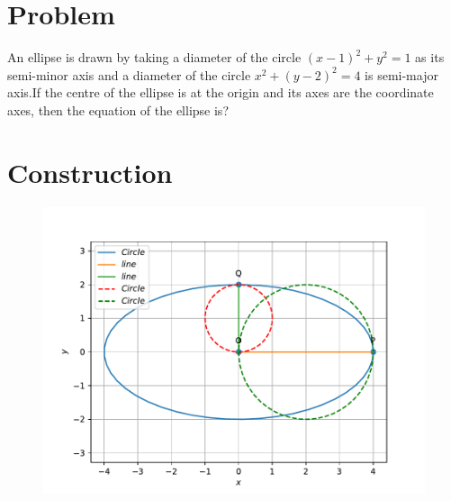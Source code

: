 \documentclass[10pt, a4paper]{article}
\title{\mytitle}
\author{\myauthor\hspace{1em}\\\contact\\FWC22012\hspace{6.5em}IITH\hspace{0.5em}\mymodule\hspace{6em}ASSIGN-6}
\date{}
\begin{document}
	\maketitle
\section{Problem}
An ellipse is drawn by taking a diameter of the circle
\begin{math}
(x-1)^2 + y^2=1
\end{math}
 as its semi-minor axis and a diameter of the circle 
 \begin{math}
x^2 + (y-2)^2=4
\end{math} is semi-major axis.If the centre of the ellipse is at the origin and its axes are the coordinate axes, then the equation of the ellipse is?
\section{Construction}
\begin{figure}[h]
\includegraphics[scale=0.5]{co.pdf} 
\end{figure}
\end{document}

